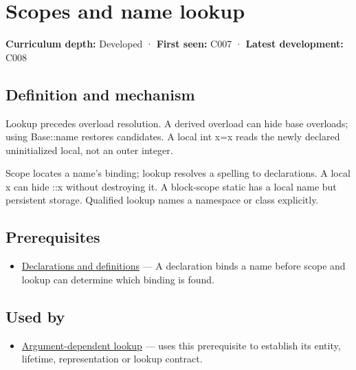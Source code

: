 \hypertarget{appendix-b12b31759da1}{}\label{referencestart:appendix-b12b31759da1}
\section{Scopes and name lookup}\label{appendix-b12b31759da1-scopes-and-name-lookup}

\textbf{Curriculum depth:} Developed · \textbf{First seen:} C007 · \textbf{Latest development:} C008

\begin{allmightroledefinition}

\subsection{Definition and mechanism}\label{appendix-b12b31759da1-definition-and-mechanism}

Lookup precedes overload resolution. A derived overload can hide base overloads; using Base::name restores candidates. A local int x=x reads the newly declared uninitialized local, not an outer integer.

\end{allmightroledefinition}

Scope locates a name's binding; lookup resolves a spelling to declarations. A local x can hide ::x without destroying it. A block-scope static has a local name but persistent storage. Qualified lookup names a namespace or class explicitly.

\subsection{Prerequisites}\label{appendix-b12b31759da1-prerequisites}

\begin{itemize}
\tightlist
\item
  \hyperref[appendix-2e4d494c2d94]{Declarations and definitions} --- A declaration binds a name before scope and lookup can determine which binding is found.
\end{itemize}

\subsection{Used by}\label{appendix-b12b31759da1-used-by}

\begin{itemize}
\tightlist
\item
  \hyperref[appendix-7863714aa97f]{Argument-dependent lookup} --- uses this prerequisite to establish its entity, lifetime, representation or lookup contract.
\end{itemize}

